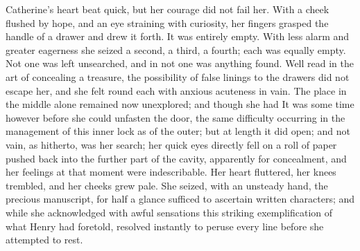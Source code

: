 Catherine's heart beat quick, but her courage did not fail her. With a cheek flushed by hope, and an eye straining with curiosity, her fingers grasped the handle of a drawer and drew it forth. It was entirely empty. With less alarm and greater eagerness she seized a second, a third, a fourth; each was equally empty. Not one was left unsearched, and in not one was anything found. Well read in the art of concealing a treasure, the possibility of false linings to the drawers did not escape her, and she felt round each with anxious acuteness in vain. The place in the middle alone remained now unexplored; and though she had  It was some time however before she could unfasten the door, the same difficulty occurring in the management of this inner lock as of the outer; but at length it did open; and not vain, as hitherto, was her search; her quick eyes directly fell on a roll of paper pushed back into the further part of the cavity, apparently for concealment, and her feelings at that moment were indescribable. Her heart fluttered, her knees trembled, and her cheeks grew pale. She seized, with an unsteady hand, the precious manuscript, for half a glance sufficed to ascertain written characters; and while she acknowledged with awful sensations this striking exemplification of what Henry had foretold, resolved instantly to peruse every line before she attempted to rest.


